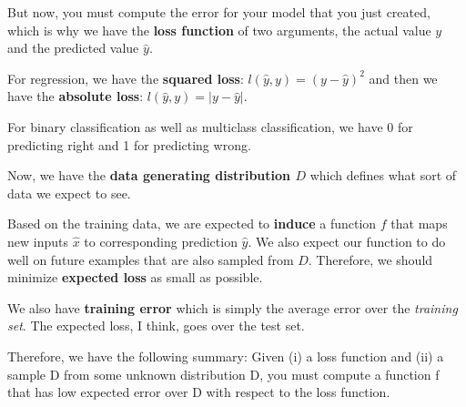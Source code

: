 \documentclass{article}
\begin{document}
\vspace{0.5cm}

But now, you must compute the error for your model that you just created, which is why we have the \textbf{loss function} of two arguments, the actual value $y$ and the predicted value $\hat{y}$.

\vspace{0.5cm}


For regression, we have the \textbf{squared loss}: $l(\hat{y},y) = (y - \hat{y})^2$ and then we have the \textbf{absolute loss}: $l(\hat{y}, y) = | y - \hat{y}\vert$.

\vspace{0.5cm}

For binary classification as well as multiclass classification, we have 0 for predicting right and 1 for predicting wrong.

\vspace{0.5cm}

Now, we have the \textbf{data generating distribution $D$} which defines what sort of data we expect to see. 

\vspace{0.5cm}

Based on the training data, we are expected to \textbf{induce} a function $f$ that maps new inputs $\hat{x}$ to corresponding prediction $\hat{y}$. We also expect our function to do well on future examples that are also sampled from $D$. Therefore, we should minimize \textbf{expected loss} as small as possible.

\vspace{0.5cm}

We also have \textbf{training error} which is simply the average error over the \textit{training set}. The expected loss, I think, goes over the test set.

Therefore, we have the following summary: Given (i) a loss function and (ii) a sample D from some unknown distribution D, you must compute a function f that has low expected error over D with respect to the loss function.
\end{document}
